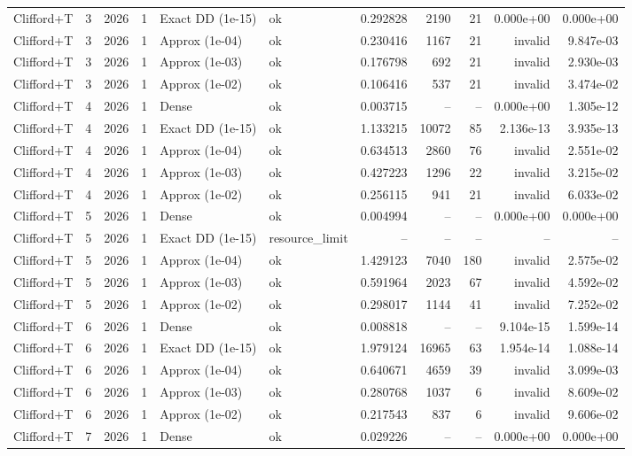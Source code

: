 \begin{tabular}{lrrrllrrrrr}
Clifford+T & 3 & 2026 & 1 & Exact DD (1e-15) & ok & 0.292828 & 2190 & 21 & 0.000e+00 & 0.000e+00 \\
Clifford+T & 3 & 2026 & 1 & Approx (1e-04) & ok & 0.230416 & 1167 & 21 & invalid & 9.847e-03 \\
Clifford+T & 3 & 2026 & 1 & Approx (1e-03) & ok & 0.176798 & 692 & 21 & invalid & 2.930e-03 \\
Clifford+T & 3 & 2026 & 1 & Approx (1e-02) & ok & 0.106416 & 537 & 21 & invalid & 3.474e-02 \\
Clifford+T & 4 & 2026 & 1 & Dense & ok & 0.003715 & -- & -- & 0.000e+00 & 1.305e-12 \\
Clifford+T & 4 & 2026 & 1 & Exact DD (1e-15) & ok & 1.133215 & 10072 & 85 & 2.136e-13 & 3.935e-13 \\
Clifford+T & 4 & 2026 & 1 & Approx (1e-04) & ok & 0.634513 & 2860 & 76 & invalid & 2.551e-02 \\
Clifford+T & 4 & 2026 & 1 & Approx (1e-03) & ok & 0.427223 & 1296 & 22 & invalid & 3.215e-02 \\
Clifford+T & 4 & 2026 & 1 & Approx (1e-02) & ok & 0.256115 & 941 & 21 & invalid & 6.033e-02 \\
Clifford+T & 5 & 2026 & 1 & Dense & ok & 0.004994 & -- & -- & 0.000e+00 & 0.000e+00 \\
Clifford+T & 5 & 2026 & 1 & Exact DD (1e-15) & resource\_limit & -- & -- & -- & -- & -- \\
Clifford+T & 5 & 2026 & 1 & Approx (1e-04) & ok & 1.429123 & 7040 & 180 & invalid & 2.575e-02 \\
Clifford+T & 5 & 2026 & 1 & Approx (1e-03) & ok & 0.591964 & 2023 & 67 & invalid & 4.592e-02 \\
Clifford+T & 5 & 2026 & 1 & Approx (1e-02) & ok & 0.298017 & 1144 & 41 & invalid & 7.252e-02 \\
Clifford+T & 6 & 2026 & 1 & Dense & ok & 0.008818 & -- & -- & 9.104e-15 & 1.599e-14 \\
Clifford+T & 6 & 2026 & 1 & Exact DD (1e-15) & ok & 1.979124 & 16965 & 63 & 1.954e-14 & 1.088e-14 \\
Clifford+T & 6 & 2026 & 1 & Approx (1e-04) & ok & 0.640671 & 4659 & 39 & invalid & 3.099e-03 \\
Clifford+T & 6 & 2026 & 1 & Approx (1e-03) & ok & 0.280768 & 1037 & 6 & invalid & 8.609e-02 \\
Clifford+T & 6 & 2026 & 1 & Approx (1e-02) & ok & 0.217543 & 837 & 6 & invalid & 9.606e-02 \\
Clifford+T & 7 & 2026 & 1 & Dense & ok & 0.029226 & -- & -- & 0.000e+00 & 0.000e+00 \\

\end{tabular}
